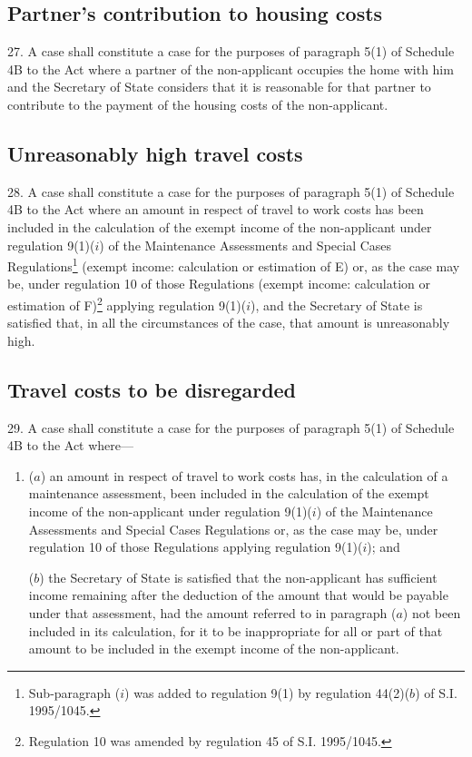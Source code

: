 \documentclass[a4paper]{article}
\begin{document}
\subsection[27. Partner’s contribution to housing costs]{Partner’s contribution to housing costs}

27.  A case shall constitute a case for the purposes of paragraph 5(1) of Schedule 4B to the Act where a partner of the non-applicant occupies the home with him and the Secretary of State considers that it is reasonable for that partner to contribute to the payment of the housing costs of the non-applicant.

\subsection[28. Unreasonably high travel costs]{Unreasonably high travel costs}

28.  A case shall constitute a case for the purposes of paragraph 5(1) of Schedule 4B to the Act where an amount in respect of travel to work costs has been included in the calculation of the exempt income of the non-applicant under regulation 9(1)($i$) of the Maintenance Assessments and Special Cases Regulations\footnote{\frenchspacing Sub-paragraph ($i$) was added to regulation 9(1) by regulation 44(2)($b$) of S.I. 1995/1045.} (exempt income: calculation or estimation of E) or, as the case may be, under regulation 10 of those Regulations (exempt income: calculation or estimation of F)\footnote{\frenchspacing Regulation 10 was amended by regulation 45 of S.I. 1995/1045.} applying regulation 9(1)($i$), and the Secretary of State is satisfied that, in all the circumstances of the case, that amount is unreasonably high.

\subsection[29. Travel costs to be disregarded]{Travel costs to be disregarded}

29.  A case shall constitute a case for the purposes of paragraph 5(1) of Schedule 4B to the Act where—
\begin{enumerate}\item[]
($a$) an amount in respect of travel to work costs has, in the calculation of a maintenance assessment, been included in the calculation of the exempt income of the non-applicant under regulation 9(1)($i$) of the Maintenance Assessments and Special Cases Regulations or, as the case may be, under regulation 10 of those Regulations applying regulation 9(1)($i$); and

($b$) the Secretary of State is satisfied that the non-applicant has sufficient income remaining after the deduction of the amount that would be payable under that assessment, had the amount referred to in paragraph ($a$) not been included in its calculation, for it to be inappropriate for all or part of that amount to be included in the exempt income of the non-applicant.
\end{enumerate}
\end{document}

